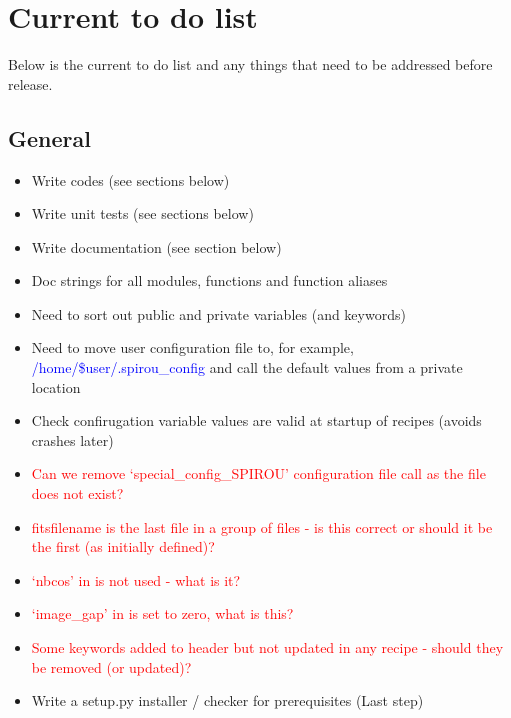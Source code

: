 \chapter{Current to do list}
\label{ch:todo}

Below is the current to do list and any things that need to be addressed before release.

\section{General}
\label{ch:todo:general}

\begin{itemize}
	\item Write codes (see sections below)
	\item Write unit tests (see sections below)
	\item Write documentation (see section below)
	\item Doc strings for all modules, functions and function aliases
	\item Need to sort out public and private variables (and keywords)
	\item Need to move user configuration file to, for example, \textcolor{blue}{/home/\$user/.spirou\_config} and call the default values from a private location
	\item Check confirugation variable values are valid at startup of recipes (avoids crashes later)
	\item \textcolor{red}{Can we remove `special\_config\_SPIROU' configuration file call as the file does not exist?}
	\item \textcolor{red}{fitsfilename is the last file in a group of files - is this correct or should it be the first (as initially defined)?}
	\item \textcolor{red}{`nbcos' in \spirouImage is not used - what is it?}
	\item \textcolor{red}{`image\_gap' in \spirouLOCOR is set to zero, what is this?}
	\item \textcolor{red}{Some keywords added to header but not updated in any recipe - should they be removed (or updated)?}
	\item Write a setup.py installer / checker for prerequisites (Last step)
\end{itemize}

